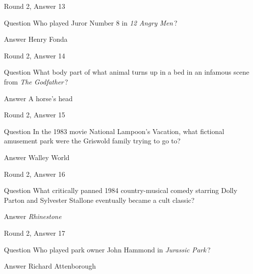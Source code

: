 \documentclass[11pt]{beamer}
\begin{document}
\begin{frame}[t]{Round 2, Answer 13}
\vspace{2em}
\begin{block}{Question}
Who played Juror Number 8 in \emph{12 Angry Men}\,?
\end{block}
\pause{}
\begin{block}{Answer}
Henry Fonda
\end{block}
\end{frame}
    

\begin{frame}[t]{Round 2, Answer 14}
\vspace{2em}
\begin{block}{Question}
What body part of what animal turns up in a bed in an infamous scene from \emph{The Godfather}\,?
\end{block}
\pause{}
\begin{block}{Answer}
A horse's head
\end{block}
\end{frame}
    

\begin{frame}[t]{Round 2, Answer 15}
\vspace{2em}
\begin{block}{Question}
In the 1983 movie National Lampoon's Vacation, what fictional amusement park were the Griswold family trying to go to?
\end{block}
\pause{}
\begin{block}{Answer}
Walley World
\end{block}
\end{frame}
    

\begin{frame}[t]{Round 2, Answer 16}
\vspace{2em}
\begin{block}{Question}
What critically panned 1984 country-musical comedy starring Dolly Parton and Sylvester Stallone eventually became a cult classic?
\end{block}
\pause{}
\begin{block}{Answer}
\emph{Rhinestone}
\end{block}
\end{frame}
    

\begin{frame}[t]{Round 2, Answer 17}
\vspace{2em}
\begin{block}{Question}
Who played park owner John Hammond in \emph{Jurassic Park}\,?
\end{block}
\pause{}
\begin{block}{Answer}
Richard Attenborough
\end{block}
\end{frame}
    
\end{document}
